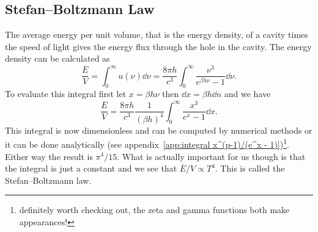 \documentclass[a4paper]{article}
\newcommand{\mean}[1]{\overline{#1}}
\begin{document}
    \subsection{Stefan--Boltzmann Law}
    The average energy per unit volume, that is the energy density, of a cavity times the speed of light gives the energy flux through the hole in the cavity.
    The energy density can be calculated as
    \[\frac{\mean{E}}{V} = \int_{0}^{\infty} u(\nu)\dd{\nu} = \frac{8\pi h}{c^3} \int_{0}^{\infty} \frac{\nu^3}{e^{\beta h\nu} - 1}\dd{\nu}.\]
    To evaluate this integral first let \(x = \beta h\nu\) then \(\dd{x} = \beta h\dd{n}\) and we have
    \begin{equation}\label{eqn:radiation energy density}
        \frac{\mean{E}}{V} = \frac{8\pi h}{c^3}\frac{1}{(\beta h)^4} \int_{0}^{\infty} \frac{x^3}{e^{x} - 1}\dd{x}.
    \end{equation}
    This integral is now dimensionless and can be computed by numerical methods or it can be done analytically (see appendix~\ref{app:integral x^(p-1)/(e^x - 1)})\footnote{definitely worth checking out, the zeta and gamma functions both make appearances!}.
    Either way the result is \(\pi^4/15\).
    What is actually important for us though is that the integral is just a constant and we see that \(\mean{E}/V \propto T^{4}\).
    This is called the Stefan--Boltzmann law.
    
\end{document}
